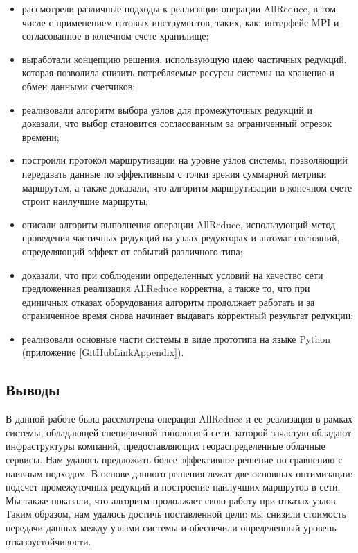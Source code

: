 \documentclass{article}
\theoremstyle{plain}
\theoremstyle{plain}
\theoremstyle{plain}
\theoremstyle{plain}
\theoremstyle{definition}
\theoremstyle{remark}
\theoremstyle{plain}
\begin{document}
\begin{itemize}
    \item рассмотрели различные подходы к реализации операции AllReduce, в том числе с применением готовых инструментов, таких, как: интерфейс MPI и согласованное в конечном счете хранилище;
    
    \item выработали концепцию решения, использующую идею частичных редукций, которая позволила снизить потребляемые ресурсы системы на хранение и обмен данными счетчиков;
    
    \item реализовали алгоритм выбора узлов для промежуточных редукций и доказали, что выбор становится согласованным за ограниченный отрезок времени;
    
    \item построили протокол маршрутизации на уровне узлов системы, позволяющий передавать данные по эффективным с точки зрения суммарной метрики маршрутам, а также доказали, что алгоритм маршрутизации в конечном счете строит наилучшие маршруты;
    
    \item описали алгоритм выполнения операции AllReduce, использующий метод проведения частичных редукций на узлах-редукторах и автомат состояний, определяющий эффект от событий различного типа;
    
    \item доказали, что при соблюдении определенных условий на качество сети предложенная реализация AllReduce корректна, а также то, что при единичных отказах оборудования алгоритм продолжает работать и за ограниченное время снова начинает выдавать корректный результат редукции;
    
    \item реализовали основные части системы в виде прототипа на языке Python (приложение \ref{GitHubLinkAppendix}).
\end{itemize}

\subsection{Выводы}

В данной работе была рассмотрена операция AllReduce и ее реализация в рамках системы, обладающей специфичной топологией сети, которой зачастую обладают инфраструктуры компаний, предоставляющих геораспределенные облачные сервисы. Нам удалось предложить более эффективное решение по сравнению с наивным подходом. В основе данного решения лежат две основных оптимизации: подсчет промежуточных редукций и построение наилучших маршрутов в сети. Мы также показали, что алгоритм продолжает свою работу при отказах узлов. Таким образом, нам удалось достичь поставленной цели: мы снизили стоимость передачи данных между узлами системы и обеспечили определенный уровень отказоустойчивости.
\end{document}
